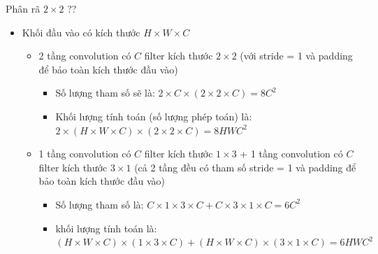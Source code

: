 \documentclass[compress]{beamer}
\begin{document}
\begin{frame}{Phân rã $2\times 2$ ??} 
\begin{itemize}
\item Khối đầu vào có kích thước $H \times W \times C$ 
\begin{itemize}
\item 2 tầng convolution có $C$ filter kích thước $2 \times 2$ (với stride = 1 và padding để bảo toàn kích thước đầu vào) 
\begin{itemize}
\item Số lượng tham số sẽ là: $2 \times C \times (2 \times 2 \times C) = 8C^2$ 
\item Khối lượng tính toán (số lượng phép toán) là: $2 \times (H \times W \times C) \times (2 \times 2 \times C) = 8HWC^2$
\end{itemize}
\item 1 tầng convolution có $C$ filter kích thước $1 \times 3 $ + 1 tầng convolution có $C$ filter kích thước $3 \times 1$ (cả 2 tầng đều có tham số stride = 1 và padding để bảo toàn kích thước đầu vào)
\begin{itemize}
\item Số lượng tham số là: $C \times 1 \times 3 \times C+ C \times 3 \times 1 \times C = 6C^2$ 
\item khối lượng tính toán là: $(H \times W \times C) \times (1 \times 3 \times C) + (H \times W \times C) \times (3 \times 1 \times C) = 6HWC^2$
\end{itemize}
\end{itemize}
\end{itemize}
\end{frame}
\end{document}
